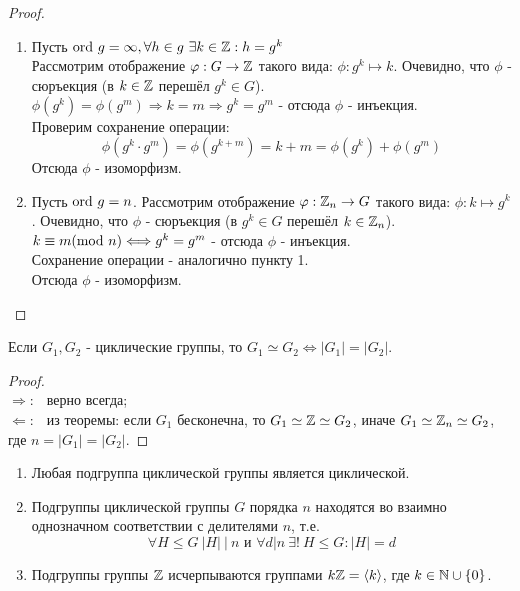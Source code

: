 \begin{proof}\tab
    \begin{enumerate}
        \item Пусть $\textup{ord } g = \infty, \forall h \in g \ \exists k \in \mathbb{Z}: h = g^k$\\
        Рассмотрим отображение $\varphi: G \rightarrow \mathbb{Z}$ такого вида: $\phi: g^k \mapsto k$. Очевидно, что $\phi$ - сюръекция (в $k\in \mathbb{Z}$ перешёл $g^k \in G$).\\
        $\phi(g^k) = \phi(g^m) \Longrightarrow k = m \Longrightarrow g^k = g^m$ - отсюда $\phi$ - инъекция.\\
        Проверим сохранение операции:
        \[\phi(g^k \cdot g^m) = \phi(g^{k+m}) = k+m = \phi(g^k) + \phi(g^m)\]
        Отсюда $\phi$ - изоморфизм.
        \item Пусть $\textup{ord } g = n$. Рассмотрим отображение $\varphi: \mathbb{Z}_n \rightarrow G$ такого вида: $\phi: k \mapsto g^k$. Очевидно, что $\phi$ - сюръекция (в $g^k\in G$ перешёл $k \in \mathbb{Z}_n$).\\
        $k \equiv m (\textup{mod } n) \Longleftrightarrow g^k = g^m$ - отсюда $\phi$ - инъекция.\\
        Сохранение операции - аналогично пункту 1.\\ 
        Отсюда $\phi$ - изоморфизм.
    \end{enumerate}
\end{proof}
\begin{consequense}
    Если $G_1, G_2$ - циклические группы, то $G_1 \simeq G_2 \Longleftrightarrow |G_1| = |G_2|$.
\end{consequense}
\begin{proof} \tab\\
    $\Longrightarrow : \ \ $ верно всегда;\\
    $\Longleftarrow : \ \ $ из теоремы: если $G_1$ бесконечна, то $G_1 \simeq \mathbb{Z} \simeq G_2$, иначе $G_1 \simeq \mathbb{Z}_n \simeq G_2$, где $n = |G_1| = |G_2|$.
\end{proof}
\begin{theoremnum} \tab
    \begin{enumerate}
        \item Любая подгруппа циклической группы является циклической.
        \item Подгруппы циклической группы $G$ порядка $n$ находятся во взаимно однозначном соответствии с делителями $n$, т.е.
        \[\forall H \leq G \ |H| \ |\  n \text{ и } \forall d | n \ \exists! \ H \leq G : |H| = d\]
        \item Подгруппы группы $\mathbb{Z}$ исчерпываются группами $k\mathbb{Z} =  \langle k \rangle$, где $k \in \mathbb{N} \cup \{0\}$.
    \end{enumerate}
\end{theoremnum}
